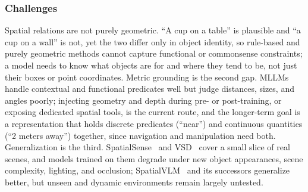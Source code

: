 \subsubsection{Challenges}
Spatial relations are not purely geometric. ``A cup on a table'' is plausible and ``a cup on a wall'' is not, yet the two differ only in object identity, so rule-based and purely geometric methods cannot capture functional or commonsense constraints; a model needs to know what objects are for and where they tend to be, not just their boxes or point coordinates.
Metric grounding is the second gap. MLLMs handle contextual and functional predicates well but judge distances, sizes, and angles poorly; injecting geometry and depth during pre- or post-training, or exposing dedicated spatial tools, is the current route, and the longer-term goal is a representation that holds discrete predicates (``near'') and continuous quantities (``2 meters away'') together, since navigation and manipulation need both.
Generalization is the third. SpatialSense~\cite{yang2019spatialsense} and VSD~\cite{zhao2022visual} cover a small slice of real scenes, and models trained on them degrade under new object appearances, scene complexity, lighting, and occlusion; SpatialVLM~\cite{chen2024spatialvlm} and its successors generalize better, but unseen and dynamic environments remain largely untested.

